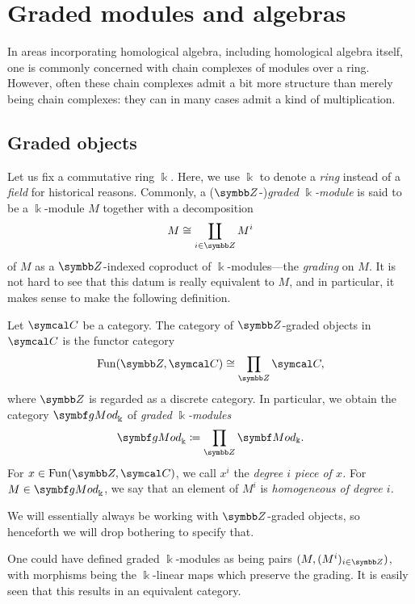 
\section{Graded modules and algebras}\label{lecture:graded-algebra}
In areas incorporating homological algebra, including homological algebra itself, one is commonly concerned with chain complexes of modules over a ring.
However, often these chain complexes admit a bit more structure than merely being chain complexes: they can in many cases admit a kind of multiplication.

\subsection{Graded objects}
Let us fix a commutative ring \(\Bbbk\). Here, we use \(\Bbbk\) to denote a \emph{ring} instead of a \emph{field} for historical reasons.
Commonly, a (\(\Z\)-)\emph{graded} \(\Bbbk\)\emph{-module} is said to be a \(\Bbbk\)-module \(M\) together with a decomposition
\[ M \cong \coprod_{i\in\Z}M^i \]
of \(M\) as a \(\Z\)-indexed coproduct of \(\Bbbk\)-modules---the \emph{grading} on \(M\). It is not hard to see that this datum is really equivalent to \(M\), and
in particular, it makes sense to make the following definition.
\begin{definition}
	Let \(\calC\) be a category. The category of \(\Z\)-graded objects in \(\calC\) is the functor category
	\[ \Fun(\Z,\calC) \cong \prod_{\Z}\calC, \]
	where \(\Z\) is regarded as a discrete category. In particular, we obtain the category \(\gMod_\Bbbk\) of \emph{graded} \(\Bbbk\)\emph{-modules}
	\[ \gMod_{\Bbbk} \coloneq \prod_{\Z}\Mod_{\Bbbk}. \]
	For \(x\in\Fun(\Z,\calC)\), we call \(x^i\) the \emph{degree \(i\) piece of \(x\).} For \(M\in\gMod_\Bbbk\), we say that an element
	of \(M^i\) is \emph{homogeneous of degree \(i\).}
\end{definition}
\begin{remark}
	We will essentially always be working with \(\Z\)-graded objects, so henceforth we will drop bothering to specify that.
\end{remark}
\begin{remark}
	One could have defined graded \(\Bbbk\)-modules as being pairs \((M,(M^i)_{i\in\Z})\), with morphisms being the \(\Bbbk\)-linear maps
	which preserve the grading. It is easily seen that this results in an equivalent category.
\end{remark}

